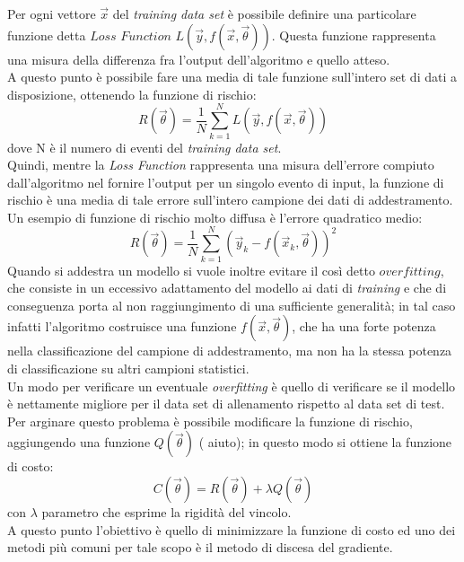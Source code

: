 Per ogni vettore $\vec{x}$ del \textit{training data set} è possibile definire una particolare funzione detta $\textit{Loss Function}$ $L(\vec{y},f(\vec{x},\vec{\theta}))$. Questa funzione rappresenta una misura della differenza fra l'output dell'algoritmo e quello atteso.\\ 
A questo punto è possibile fare una media di tale funzione sull'intero set di dati a disposizione, ottenendo la funzione di rischio: \\
\begin{equation}
R(\vec{\theta}) = \frac{1}{N}\sum_{k=1}^{N}L(\vec{y},f(\vec{x},\vec{\theta}))
\end{equation}
dove N è il numero di eventi del \textit{training data set}. \\
Quindi, mentre la \textit{Loss Function} rappresenta una misura dell'errore compiuto dall'algoritmo nel fornire l'output per un singolo evento di input, la funzione di rischio è una media di tale errore sull'intero campione dei dati di addestramento.\\
Un esempio di funzione di rischio molto diffusa è l'errore quadratico medio:
\begin{equation}
R(\vec{\theta}) = \frac{1}{N}\sum_{k=1}^{N}(\vec{y}_k - f(\vec{x}_k , \vec{\theta}))^2
\end{equation}
Quando si addestra un modello si vuole inoltre evitare il così detto $\textit{overfitting}$, che consiste in un eccessivo adattamento del modello ai dati di \textit{training} e che di conseguenza porta al non raggiungimento di una sufficiente generalità; in tal caso infatti l'algoritmo costruisce una funzione $f(\vec{x},\vec{\theta})$, che ha una forte potenza nella classificazione del campione di addestramento, ma non ha la stessa potenza di classificazione su altri campioni statistici. \\
Un modo per verificare un eventuale \textit{overfitting} è quello di verificare se il modello è nettamente migliore per il data set di allenamento rispetto al data set di test. \\
Per arginare questo problema è possibile modificare la funzione di rischio, aggiungendo una funzione $Q(\vec{\theta})$ (\color{red} aiuto\color{black}); in questo modo si ottiene la funzione di costo:
\begin{equation}
C(\vec{\theta}) = R(\vec{\theta}) + \lambda Q(\vec{\theta})
\end{equation}
con $\lambda$ parametro che esprime la rigidità del vincolo.\\
A questo punto l'obiettivo è quello di minimizzare la funzione di costo ed uno dei metodi più comuni per tale scopo è il metodo di discesa del gradiente.\\
